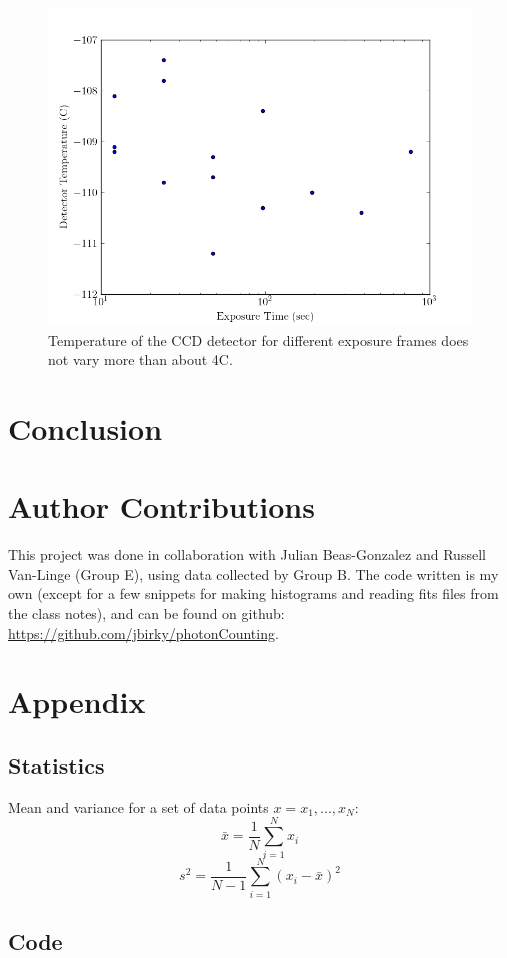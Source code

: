 \documentclass[preprint]{aastex62}
\begin{document}
\begin{figure}[ht]
\begin{center}
\includegraphics[width=.48\linewidth]{plots/exposure_temp.png}
\caption{Temperature of the CCD detector for different exposure frames does not vary more than about 4C.} \label{fig:temp}
\end{center}
\end{figure}

\section{Conclusion}

\section{Author Contributions}

This project was done in collaboration with Julian Beas-Gonzalez and Russell Van-Linge (Group E), using data collected by Group B. The code written is my own (except for a few snippets for making histograms and reading fits files from the class notes), and can be found on github: \href{https://github.com/jbirky/photonCounting}{https://github.com/jbirky/photonCounting}.

\section{Appendix}

\subsection{Statistics}
Mean and variance for a set of data points $x={x_1, ...,x_N}$:
\begin{equation}
	\bar{x} = \frac{1}{N} \sum^N_{i=1} x_i  
\end{equation}
\begin{equation}
	s^2 = \frac{1}{N-1} \sum^N_{i=1} (x_i - \bar{x})^2
\end{equation}

\subsection{Code}


\end{document}

